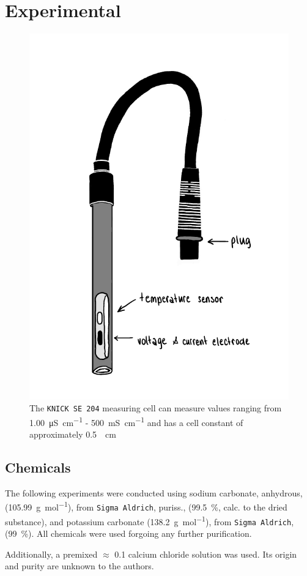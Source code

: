 \section{Experimental}



\begin{figure}[H]
    \centering
    \includegraphics[width=.5\textwidth]{figures/Conductometer.pdf}
    \caption{The \texttt{KNICK SE 204} measuring cell can measure values ranging from \qty{1.00}{\micro\siemens\per\centi\meter} - \qty{500}{\milli\siemens\per\centi\meter} and has a cell constant of approximately \qty[per-mode=reciprocal]{0.5}{\per\centi\meter}}
    \label{fig:sketch_cond}
\end{figure}


\subsection{Chemicals}
The following experiments were conducted using sodium carbonate, anhydrous, (\qty{105.99}{\gram\per\mole}), from \texttt{Sigma Aldrich}, puriss., (\qty{99.5}{\percent}, calc. to the dried substance), and potassium carbonate (\qty{138.2}{\gram\per\mole}), from \texttt{Sigma Aldrich}, (\qty{99}{\percent}). All chemicals were used forgoing any further purification.

Additionally, a premixed $\approx$ \qty{0.1}{\M} calcium chloride solution was used. Its origin and purity are unknown to the authors.

